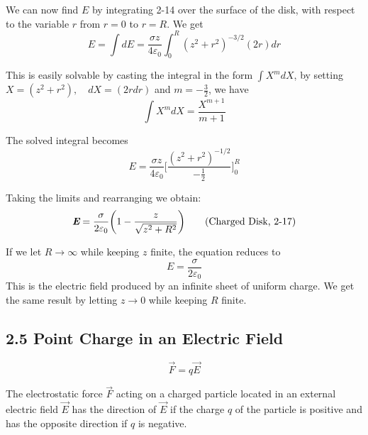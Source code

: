 \documentclass[12pt, a4paper]{article}
\begin{document}
		We can now find $E$ by integrating 2-14 over the surface of the disk, with respect to the variable $r$ from $r = 0$ to $r = R$. We get
		\begin{equation*}
			E = \int dE = \frac{\sigma z}{4\varepsilon_0} \int_{0}^{R} (z^2 + r^2)^{-3/2}(2r)dr
			\tag{2-15}
		\end{equation*}
	
		This is easily solvable by casting the integral in the form $\int X^mdX$, by setting \\ $X = (z^2 + r^2),\quad dX = (2rdr)$  and  $ m = -\frac{3}{2}$, we have
		\begin{equation*}
			\int X^m dX = \frac{X^{m+1}}{m+1}
		\end{equation*}
	
		The solved integral becomes
		\begin{equation*}
			E = \frac{\sigma z}{4\varepsilon_0} \biggl[\frac{(z^2 + r^2)^{-1/2}}{-\frac{1}{2}} \biggl]_{0}^{R}
			\tag{2-16}
		\end{equation*}
	
		Taking the limits and rearranging we obtain:
		\begin{equation*}
			\textit{\textbf{E}} = \frac{\sigma}{2\varepsilon_0} \biggl(1 - \frac{z}{\sqrt{z^2 + R^2}} \biggl)
			\tag{Charged Disk, 2-17}
		\end{equation*}
		
		If we let $R \rightarrow \infty$ while keeping $z$ finite, the equation reduces to
		\begin{equation*}
			E = \frac{\sigma}{2\varepsilon_0}
			\tag{2-18}
		\end{equation*}
		This is the electric field produced by an infinite sheet of uniform charge. We get the same result by letting $z \rightarrow 0$ while keeping $R$ finite.
		
		
		
		\subsection*{2.5 Point Charge in an Electric Field}
		
		\begin{equation*}
			\vec{F} = q\vec{E}
			\tag{2-19}
		\end{equation*}
		
		The electrostatic force $\vec{F}$ acting on a charged particle located in an external electric field $\vec{E}$ has the direction of $\vec{E}$ if the charge $q$ of the particle is positive and has the opposite direction if $q$ is negative.
		
\end{document}
